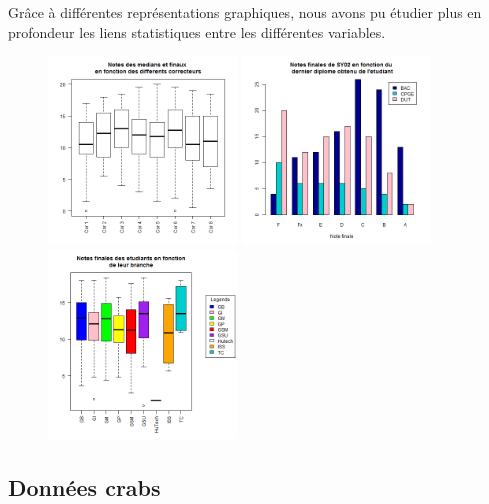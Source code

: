 \documentclass[titlepage]{article}
\begin{document}
\subsubsection{}
Grâce à différentes représentations graphiques, nous avons pu étudier plus en profondeur les liens statistiques entre les différentes variables.

\begin{figure}[H]
\begin{center}
\includegraphics[width=5cm]{correcteurs-notes.png}
\includegraphics[width=5cm]{diplome-notes.png}
\includegraphics[width=5cm]{branche-notes.png}
\end{center}
\end{figure}
\subsection{Données crabs}
\end{document}
